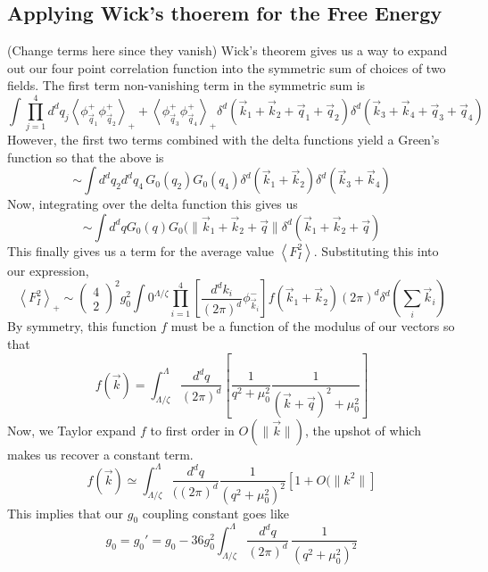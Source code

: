 \subsection{Applying Wick's thoerem for the Free Energy} 

(Change terms here since they vanish) 
Wick's theorem gives us a way to expand out our four point
correlation function into the symmetric sum of choices 
of two fields. The first term non-vanishing term in the symmetric sum is 
\[
 \int \prod_{ j = 1 } ^ 4 d ^ d q_ j \left< \phi_{ \vec{q} _ 1 } ^ + 
 \phi _{ \vec{q} _ 2 } ^ + \right>_ + + 
 \left< \phi _{\vec{q} _ 3 } ^ + \phi _{ \vec{q} _ 4 } ^ +  \right>_ + 
 \delta ^ d ( \vec{k} _ 1 + \vec{k} _ 2 + \vec{q} _ 1 + \vec{q} _ 2 ) 
 \delta ^ d ( \vec{k} _ 3 + \vec{k}_ 4 + \vec{q} _ 3 + \vec{q} _ 4 ) 
\]  However, the first two terms combined with the delta functions 
yield a Green's function so that the above is 
\[
 \sim \int d^ d q_ 2 d ^  d q_ 4 \, 
 G_0 ( q_ 2 ) G_0 ( q_ 4 ) \delta ^ d ( \vec{k} _ 1 + \vec{k} _ 2 ) 
 \delta ^ d ( \vec{k} _ 3 + \vec{k} _ 4 ) 
\] Now, integrating over the delta function this gives us 
\[
	\sim \int d ^ d q G_0 ( q) G_0 ( \| \vec{k} _ 1 + \vec{k} _ 2 + \vec{q} \|
	\delta ^ d ( \vec{k} _ 1 + \vec{k} _ 2 + \vec{q} ) 
\] This finally gives us a term for the average value $ \left< F _ I ^ 2  \right>$. 
Substituting this into our expression, 
\[
 \left< F _ I ^ 2  \right> _ + \sim 
 \begin{pmatrix} 4 \\ 2   \end{pmatrix} ^ 2 g_0 ^ 2 
 \int 0 ^{ \Lambda  / \zeta } \prod_{ i =  1 } ^ 4 \left[  \frac{ d ^ d k _{ i } }{( 2 \pi ) ^ d  } \phi^ -_{ \vec{k} _ i } \right]
 f ( \vec{k} _ 1+ \vec{k} _ 2 ) ( 2 \pi ) ^ d \delta ^ d ( \sum_ i \vec{k} _ i ) 
\] By symmetry, this function $ f $ must be a function of the 
modulus of our vectors so that 
\[
	f ( \vec{k} ) = \int_{ \Lambda  / \zeta } ^ \Lambda \frac{ d ^ d q }{ ( 2 \pi ) ^ d } 
	\left[  \frac{1}{ q ^ 2 + \mu _0 ^ 2 } \frac{1}{ ( \vec{k} + \vec{q}) ^ 2 + \mu _ 0 ^ 2 } \right] 
\] Now, we Taylor expand $ f $ to first order in $ O ( \| \vec{k} \| ) $, 
the upshot of which makes us recover a constant term. 
\[
	f ( \vec{k} ) \simeq \int_{ \Lambda / \zeta  } ^ \Lambda 
	\frac{ d ^ d q }{  ( ( 2 \pi ) ^ d } \frac{1}{ ( q ^ 2 + \mu _ 0 ^ 2 ) ^ 2 } 
	\left[  1 + O ( \|k ^ 2 \| \right] 
\]  This implies that our $ g_0 $ coupling constant goes like 
\[
	g_0 = g_0' = g_0 - 36 g_0 ^ 2 \int_{ \Lambda / \zeta } ^ \Lambda \frac{ d ^ d q }{ ( 2 \pi ) ^  d } \, 
	\frac{1}{ ( q ^ 2 + \mu _ 0 ^ 2 ) ^ 2}
\] 
